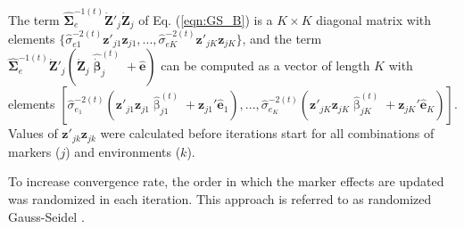 \documentclass{bmcart}
\begin{document}
The term 
$\hat{\mathbf{\Sigma}}^{-1(t)}_{e}\dot{\mathbf{Z}}'_j\dot{\mathbf{Z}}_j$ of Eq. (\ref{eqn:GS_B}) is a $K\times K$ diagonal matrix with elements $\{\hat{\sigma}^{-2(t)}_{e1}\mathbf{z}'_{j1} \mathbf{z}_{j1}, ... , \hat{\sigma}^{-2(t)}_{eK}\mathbf{z}'_{jK} \mathbf{z}_{jK}\}$, and the term $\hat{\mathbf{\Sigma}}^{-1(t)}_{e}\dot{\mathbf{Z}}'_j(\dot{\mathbf{Z}}_j\hat{\dot{\mathbf{\upbeta}}}^{(t)}_j+\hat{\mathbf{e}})$ can be computed as a vector of length $K$ with elements $[ \hat{\sigma}^{-2(t)}_{e_1}(\mathbf{z}'_{j1} \mathbf{z}_{j1} \hat{\upbeta}^{(t)}_{j1} + \mathbf{z}_{j1}' \hat{\mathbf{e}}_1), ... , \hat{\sigma}^{-2(t)}_{e_K}(\mathbf{z}'_{jK} \mathbf{z}_{jK} \hat{\upbeta}^{(t)}_{jK} + \mathbf{z}_{jK}' \hat{\mathbf{e}}_K)]$. Values of $\mathbf{z}'_{jk} \mathbf{z}_{jk}$ were calculated before iterations start for all combinations of markers ($j$) and environments ($k$). 

To increase convergence rate, the order in which the marker effects are updated was randomized in each iteration. This approach is referred to as randomized Gauss-Seidel \cite{LL2010,Ma2015}.
\end{document}
